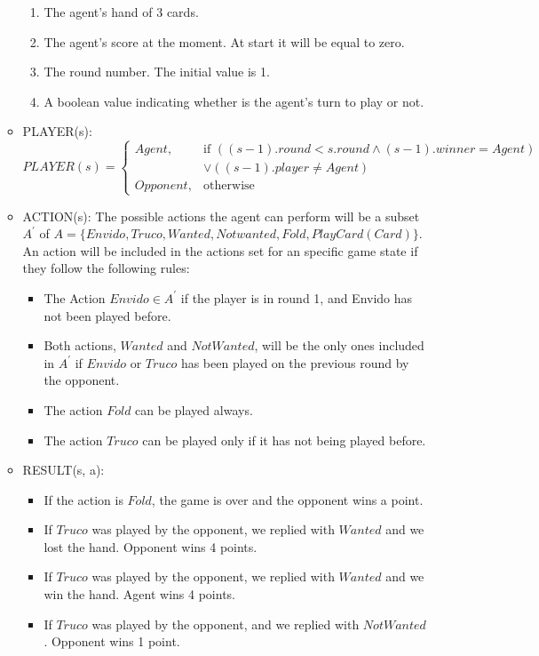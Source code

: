 \documentclass{article}
\begin{document}
\begin{enumerate}
\begin{itemize}
	\begin{enumerate}
		\item The agent's hand of 3 cards.
		\item The agent's score at the moment. At start it will be equal to zero.      
		\item The round number. The initial value is 1.
		\item A boolean value indicating whether is the agent's turn to play or not.
	\end{enumerate}
	\item PLAYER(s):
	\[
	PLAYER(s) = 
	\begin{cases}
	Agent,& \text{if } ((s-1).round < s.round \land (s-1).winner = Agent) \\ 
	& \lor ((s-1).player \neq Agent)  \\
	Opponent,              & \text{otherwise}
	\end{cases}
	\]
	\item ACTION(s):
	The possible actions the agent can perform will be a subset $A^\prime$ of $A = \{Envido, Truco, Wanted, Not wanted, Fold, PlayCard(Card) \}$. An action will be included in the actions set for an specific game state if they follow the following rules:
	\begin{itemize}
		\item The Action $Envido \in A^\prime$ if the player is in round 1, and Envido has not been played before.
		\item Both actions, $Wanted$ and $Not Wanted$, will be the only ones included in $A^\prime$ if $Envido$ or $Truco$ has been played on the previous round by the opponent.
		\item The action $Fold$ can be played always.
		\item The action $Truco$ can be played only if it has not being played before.
	\end{itemize}
	\item RESULT(s, a): 
	\begin{itemize}
		\item If the action is $Fold$, the game is over and the opponent wins a point.
		\item If $Truco$ was played by the opponent, we replied with $Wanted$ and we lost the hand. Opponent wins 4 points.
		\item If $Truco$ was played by the opponent, we replied with $Wanted$ and we win the hand. Agent wins 4 points.
		\item If $Truco$ was played by the opponent, and we replied with $Not Wanted$. Opponent wins 1 point.

\end{itemize}
\end{itemize}
\end{enumerate}
\end{document}
